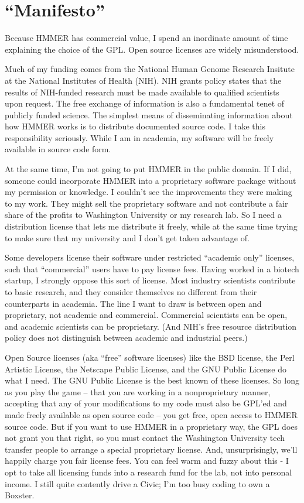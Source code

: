 \section{``Manifesto''}

Because HMMER has commercial value, I spend an inordinate amount of
time explaining the choice of the GPL. Open source licenses are widely
misunderstood.

Much of my funding comes from the National Human Genome Research
Insitute at the National Institutes of Health (NIH). NIH grants policy
states that the results of NIH-funded research must be made available
to qualified scientists upon request. The free exchange of information
is also a fundamental tenet of publicly funded science. The simplest
means of disseminating information about how HMMER works is to
distribute documented source code. I take this responsibility
seriously. While I am in academia, my software will be freely
available in source code form.

At the same time, I'm not going to put HMMER in the public domain.  If
I did, someone could incorporate HMMER into a proprietary software
package without my permission or knowledge. I couldn't see the
improvements they were making to my work.  They might sell the
proprietary software and not contribute a fair share of the profits to
Washington University or my research lab. So I need a distribution
license that lets me distribute it freely, while at the same time
trying to make sure that my university and I don't get taken advantage
of.

Some developers license their software under restricted ``academic
only'' licenses, such that ``commercial'' users have to pay license
fees. Having worked in a biotech startup, I strongly oppose this sort
of license. Most industry scientists contribute to basic research, and
they consider themselves no different from their counterparts in
academia. The line I want to draw is between open and proprietary, not
academic and commercial. Commercial scientists can be open, and
academic scientists can be proprietary. (And NIH's free resource
distribution policy does not distinguish between academic and
industrial peers.)

Open Source licenses (aka ``free'' software licenses) like the BSD
license, the Perl Artistic License, the Netscape Public License, and
the GNU Public License do what I need. The GNU Public License is the
best known of these licenses. So long as you play the game -- that you
are working in a nonproprietary manner, accepting that any of your
modifications to my code must also be GPL'ed and made freely available
as open source code -- you get free, open access to HMMER source code.
But if you want to use HMMER in a proprietary way, the GPL does not
grant you that right, so you must contact the Washington University
tech transfer people to arrange a special proprietary license.  And,
unsurprisingly, we'll happily charge you fair license fees. You can
feel warm and fuzzy about this - I opt to take all licensing funds
into a research fund for the lab, not into personal income.  I still
quite contently drive a Civic; I'm too busy coding to own a Boxster.


